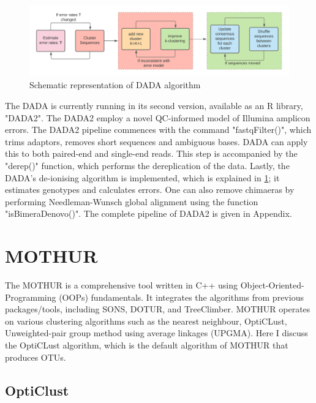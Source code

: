 \begin{figure}
  \centering
  \includegraphics[width=15cm]{../figures/Figure4.png}
  \caption{Schematic representation of DADA algorithm}
  \label{fig:figure4}
\end{figure}

The DADA is currently running in its second version, available as an R library, "DADA2". The DADA2 employ a novel QC-informed model of Illumina amplicon errors. The DADA2 pipeline commences with the command "fastqFilter()", which trims adaptors, removes short sequences and ambiguous bases. DADA can apply this to both paired-end and single-end reads. This step is accompanied by the "derep()" function, which performs the dereplication of the data. Lastly, the DADA's de-ionising algorithm is implemented, which is explained in  \ref{fig:figure4}; it estimates genotypes and calculates errors. One can also remove chimaeras by performing Needleman-Wunsch global alignment using the function "isBimeraDenovo()". The complete pipeline of DADA2 is given in Appendix.

\section{MOTHUR}
The MOTHUR is a comprehensive tool written in C++ using Object-Oriented-Programming (OOPs) fundamentals. It integrates the algorithms from previous packages/tools, including SONS, DOTUR, and TreeClimber. MOTHUR operates on various clustering algorithms such as the nearest neighbour, OptiCLust, Unweighted-pair group method using average linkages (UPGMA). Here I discuss the OptiCLust algorithm, which is the default algorithm of MOTHUR that produces OTUs.

\subsection{OptiClust}

